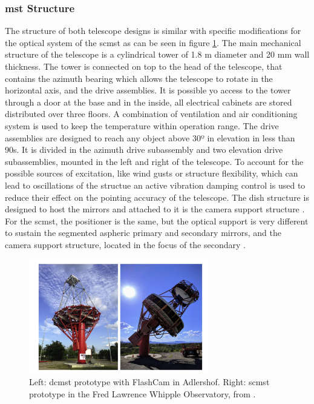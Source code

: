 \documentclass[main.tex]{subfiles}
\begin{document}
\subsubsection{\gls{mst} Structure}

The structure of both telescope designs is similar with specific modifications for the optical system of the \gls{scmst} \cite{2017SCMSTstatus} as can be seen in figure \ref{fig:2MST}.
The main mechanical structure of the telescope is a cylindrical tower of 1.8 m diameter and 20 mm wall thickness. The tower is connected on top to the head of the telescope, that contains the azimuth bearing which allows the telescope to rotate in the horizontal axis, and the drive assemblies. It is possible yo access to the tower through a door at the base and in the inside, all electrical cabinets are stored distributed over three floors. A combination of ventilation and air conditioning system is used to keep the temperature within operation range.
The drive assemblies are designed to reach any object above 30º in elevation in less than 90s. It is divided in the azimuth drive subassembly and two elevation drive subassemblies, mounted in the left and right of the telescope.
To account for the possible sources of excitation, like wind gusts or structure flexibility, which can lead to oscillations of the structue an active vibration damping control is used to reduce their effect on the pointing accuracy of the telescope.
The dish structure is designed to host the mirrors and attached to it is the camera support structure \cite{2015DCMSTstatus}.
For the \gls{scmst}, the positioner is the same, but the optical support is very different to sustain the segmented aspheric primary and secondary mirrors, and the camera support structure, located in the focus of the secondary \cite{2018MSTandLSTstatus}.


\begin{figure}
\centering
 \includegraphics[width=0.7\textwidth]{Pictures/2MSTpictures.pdf}
  \caption{Left: \gls{dcmst} prototype with FlashCam in Adlershof. Right: \gls{scmst} prototype in the Fred Lawrence Whipple Observatory, from \cite{2018MSTandLSTstatus}.}
    \label{fig:2MST}
\end{figure}
\end{document}
